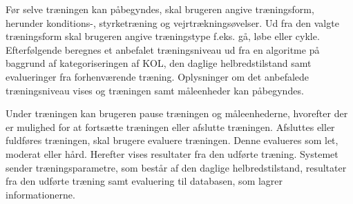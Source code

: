 \noindent
Før selve træningen kan påbegyndes, skal brugeren angive træningsform, herunder konditions-, styrketræning og vejrtrækningsøvelser. Ud fra den valgte træningsform skal brugeren angive træningstype f.eks. gå, løbe eller cykle. Efterfølgende beregnes et anbefalet træningsniveau ud fra en algoritme på baggrund af kategoriseringen af KOL, den daglige helbredstilstand samt evalueringer fra forhenværende træning. Oplysninger om det anbefalede træningsniveau vises og træningen samt måleenheder kan påbegyndes. 

Under træningen kan brugeren pause træningen og måleenhederne, hvorefter der er mulighed for at fortsætte træningen eller afslutte træningen. Afsluttes eller fuldføres træningen, skal brugere evaluere træningen. Denne evalueres som let, moderat eller hård. Herefter vises resultater fra den udførte træning. Systemet sender træningsparametre, som består af den daglige helbredstilstand, resultater fra den udførte træning samt evaluering til databasen, som lagrer informationerne. 
